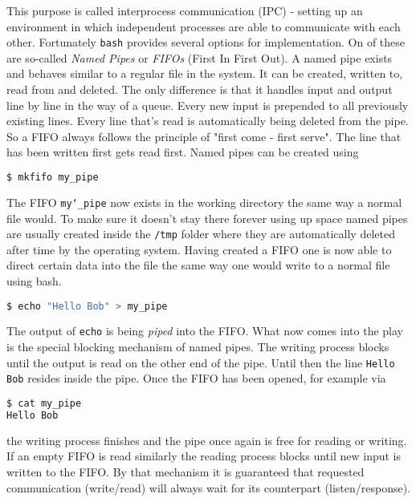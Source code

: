 This purpose is called interprocess communication (IPC) - setting up an environment in which independent processes are able to communicate with each other. Fortunately \texttt{bash} provides several options for implementation. On of these are so-called \textit{Named Pipes} or \textit{FIFOs} (First In First Out). A named pipe exists and behaves similar to a regular file in the system. It can be created, written to, read from and deleted. The only difference is that it handles input and output line by line in the way of a queue. Every new input is prepended to all previously existing lines. Every line that's read is automatically being deleted from the pipe. So a \acs{FIFO} always follows the principle of "first come - first serve". The line that has been written first gets read first. Named pipes can be created using
\begin{lstlisting}[language=bash]
$ mkfifo my_pipe
\end{lstlisting}
\noindent
The \acs{FIFO} \texttt{my\char`_pipe} now exists in the working directory the same way a normal file would. To make sure it doesn't stay there forever using up space named pipes are usually created inside the \texttt{/tmp} folder where they are automatically deleted after time by the operating system. Having created a \acs{FIFO} one is now able to direct certain data into the file the same way one would write to a normal file using bash. 
\begin{lstlisting}[language=bash]
$ echo "Hello Bob" > my_pipe
\end{lstlisting}
\noindent 
The output of \texttt{echo} is being \textit{piped} into the \acs{FIFO}. What now comes into the play is the special blocking mechanism of named pipes. The writing process blocks until the output is read on the other end of the pipe. Until then the line \texttt{Hello Bob} resides inside the pipe. Once the \acs{FIFO} has been opened, for example via
\begin{lstlisting}[language=bash]
$ cat my_pipe
Hello Bob
\end{lstlisting}
\noindent
the writing process finishes and the pipe once again is free for reading or writing. If an empty FIFO is read similarly the reading process blocks until new input is written to the FIFO. By that mechanism it is guaranteed that requested communication (write/read) will always wait for its counterpart (listen/response). 

